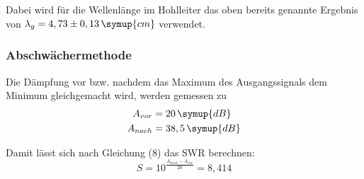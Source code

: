 Dabei wird für die Wellenlänge im Hohlleiter das oben bereits genannte Ergebnis von $\lambda_g = 4,73 \pm 0,13 \, \symup{cm}$ verwendet.

\subsubsection{Abschwächermethode}
Die Dämpfung vor bzw. nachdem das Maximum des Ausgangssignals dem Minimum
gleichgemacht wird, werden gemessen zu
\begin{align*}
  A_{vor} &= 20 \, \symup{dB} \\
  A_{nach} &= 38,5 \, \symup{dB}
\end{align*}

Damit lässt sich nach Gleichung (8) das SWR berechnen:
\begin{equation*}
  S = 10^{\frac{A_{nach}-A_{vor}}{20}} = 8,414
\end{equation*}
